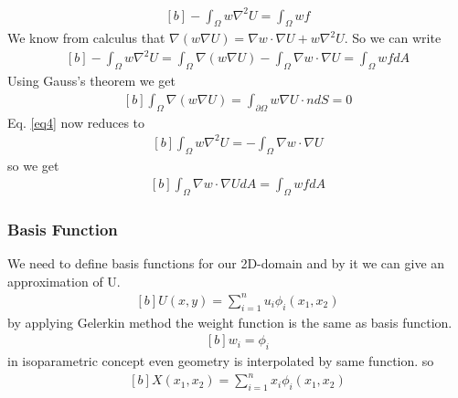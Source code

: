 \documentclass[]{article}
\begin{document}
\begin{equation}\label{eq3}
	\begin{aligned}[b]
		-\int_\Omega w\nabla^2 U = \int_\Omega wf
	\end{aligned}
\end{equation}
We know from calculus that $\nabla(w\nabla U) = \nabla w \cdot \nabla U + w\nabla ^2 U$. So we can write
\begin{equation}\label{eq4}
	\begin{aligned}[b]
		-\int_\Omega w\nabla^2U = \int_{\Omega} \nabla(w\nabla U) - \int_{\Omega} \nabla w \cdot \nabla U = \int_\Omega wf dA
	\end{aligned}
\end{equation}
Using Gauss’s theorem we get
\begin{equation}\label{eq5}
	\begin{aligned}[b]
		\int_\Omega \nabla(w\nabla U) = \int_{\partial\Omega} w \nabla U \cdot n dS = 0
	\end{aligned}
\end{equation}
Eq. \ref{eq4} now reduces to
\begin{equation}\label{eq6}
	\begin{aligned}[b]
		\int_\Omega w\nabla^2U = - \int_{\Omega} \nabla w \cdot \nabla U
	\end{aligned}
\end{equation}
so we get 
\begin{equation}\label{eq7}
	\begin{aligned}[b]
		\int_{\Omega} \nabla w \cdot \nabla U dA = \int_\Omega wf dA
	\end{aligned}
\end{equation}
\subsubsection{Basis Function} \label{sec: Basis Func}
We need to define basis functions for our 2D-domain and by it we can give an approximation of U.
\begin{equation}\label{eq8}
	\begin{aligned}[b]
		U(x,y) =\sum_{i=1}^{n} u_{i}\phi_{i}(x_{1},x_{2})
	\end{aligned}
\end{equation}
by applying Gelerkin method the weight function is the same as basis function.
\begin{equation}\label{eq9}
	\begin{aligned}[b]
		w_{i} =\phi_{i}
	\end{aligned}
\end{equation}
in isoparametric concept even geometry is interpolated by same function. so
\begin{equation}\label{eq10}
	\begin{aligned}[b]
		X(x_{1},x_{2}) =\sum_{i=1}^{n} x_{i}\phi_{i}(x_{1},x_{2})
	\end{aligned}
\end{equation}
\end{document}
